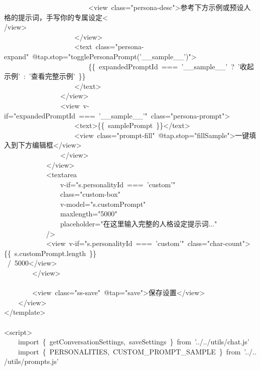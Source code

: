 \documentclass[a4paper,10pt]{article}
\begin{document}
{\ttfamily\footnotesize\raggedright
~~~~~~~~~~~~~~~~~~~~~~~~<view~class="persona-desc">参考下方示例或预设人格的提示词，手写你的专属设定<\\
/view>\\
~~~~~~~~~~~~~~~~~~~~</view>\\
~~~~~~~~~~~~~~~~~~~~<text~class="persona-expand"~@tap.stop="togglePersonaPrompt('\_\_sample\_\_')">\\
~~~~~~~~~~~~~~~~~~~~~~~~\{\{~expandedPromptId~===~'\_\_sample\_\_'~?~'收起示例'~:~'查看完整示例'~\}\}\\
~~~~~~~~~~~~~~~~~~~~</text>\\
~~~~~~~~~~~~~~~~</view>\\
~~~~~~~~~~~~~~~~<view~v-if="expandedPromptId~===~'\_\_sample\_\_'"~class="persona-prompt">\\
~~~~~~~~~~~~~~~~~~~~<text>\{\{~samplePrompt~\}\}</text>\\
~~~~~~~~~~~~~~~~~~~~<view~class="prompt-fill"~@tap.stop="fillSample">一键填入到下方编辑框</view>\\
~~~~~~~~~~~~~~~~</view>\\
~~~~~~~~~~~~</view>\\
~~~~~~~~~~~~<textarea\\
~~~~~~~~~~~~~~~~v-if="s.personalityId~===~'custom'"\\
~~~~~~~~~~~~~~~~class="custom-box"\\
~~~~~~~~~~~~~~~~v-model="s.customPrompt"\\
~~~~~~~~~~~~~~~~maxlength="5000"\\
~~~~~~~~~~~~~~~~placeholder="在这里输入完整的人格设定提示词..."\\
~~~~~~~~~~~~/>\\
~~~~~~~~~~~~<view~v-if="s.personalityId~===~'custom'"~class="char-count">\{\{~s.customPrompt.length~\}\}\\
~/~5000</view>\\
~~~~~~~~</view>\\
\mbox{}\\
~~~~~~~~<view~class="ss-save"~@tap="save">保存设置</view>\\
~~~~</view>\\
</template>\\
\mbox{}\\
<script>\\
~~~~import~\{~getConversationSettings,~saveSettings~\}~from~'../../utils/chat.js'\\
~~~~import~\{~PERSONALITIES,~CUSTOM\_PROMPT\_SAMPLE~\}~from~'../../utils/prompts.js'\\
}
\end{document}
